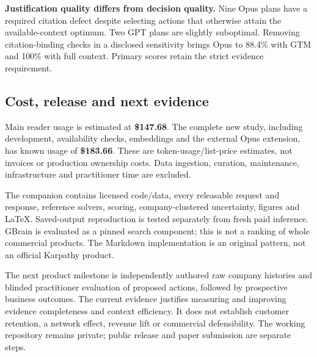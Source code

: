 \documentclass[
  11pt,
]{article}
\begin{document}
\textbf{Justification quality differs from decision quality.} Nine Opus
plans have a required citation defect despite selecting actions that
otherwise attain the available-context optimum. Two GPT plans are
slightly suboptimal. Removing citation-binding checks in a disclosed
sensitivity brings Opus to 88.4\% with GTM and 100\% with full context.
Primary scores retain the strict evidence requirement.

\subsection{Cost, release and next
evidence}\label{cost-release-and-next-evidence}

Main reader usage is estimated at \textbf{\$147.68}. The complete new
study, including development, availability checks, embeddings and the
external Opus extension, has known usage of \textbf{\$183.66}. These are
token-usage/list-price estimates, not invoices or production ownership
costs. Data ingestion, curation, maintenance, infrastructure and
practitioner time are excluded.

The companion contains licensed code/data, every releasable request and
response, reference solvers, scoring, company-clustered uncertainty,
figures and LaTeX. Saved-output reproduction is tested separately from
fresh paid inference. GBrain is evaluated as a pinned search component;
this is not a ranking of whole commercial products. The Markdown
implementation is an original pattern, not an official Karpathy product.

The next product milestone is independently authored raw company
histories and blinded practitioner evaluation of proposed actions,
followed by prospective business outcomes. The current evidence
justifies measuring and improving evidence completeness and context
efficiency. It does not establish customer retention, a network effect,
revenue lift or commercial defensibility. The working repository remains
private; public release and paper submission are separate steps.
\end{document}
